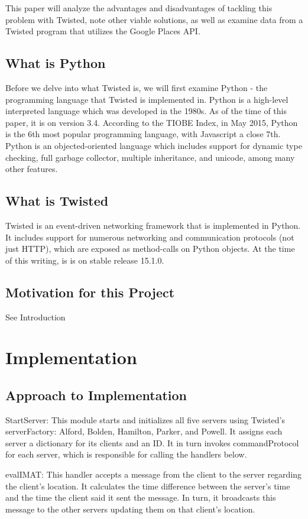\documentclass[letterpaper,twocolumn,10pt]{article}
\begin{document}
This paper will analyze the advantages and disadvantages of tackling this problem with Twisted, note other viable solutions, as well as examine data from a Twisted program that utilizes the Google Places API. 

\subsection{What is Python}
Before we delve into what Twisted is, we will first examine Python - the programming language that Twisted is implemented in. Python is a high-level interpreted language which was developed in the 1980s. As of the time of this paper, it is on version 3.4. According to the TIOBE Index, in May 2015, Python is the 6th most popular programming language, with Javascript a close 7th. Python is an objected-oriented language which includes support for dynamic type checking, full garbage collector, multiple inheritance, and unicode, among many other features. 

\subsection{What is Twisted}
Twisted is an event-driven networking framework that is implemented in Python. It includes support for numerous networking and communication protocols (not just HTTP), which are exposed as method-calls on Python objects. At the time of this writing, is is on stable release 15.1.0. 

\subsection{Motivation for this Project}
See Introduction

\section{Implementation}
\subsection{Approach to Implementation}
StartServer: This module starts and initializes all five servers using Twisted’s serverFactory: Alford, Bolden, Hamilton, Parker, and Powell. It assigns each server a dictionary for its clients and an ID. It in turn invokes commandProtocol for each server, which is responsible for calling the handlers below.

evalIMAT: This handler accepts a message from the client to the server regarding the client’s location.  It calculates the time difference between the server's time and the time the client said it sent the message. In turn, it broadcasts this message to the other servers updating them on that client’s location.
\end{document}
